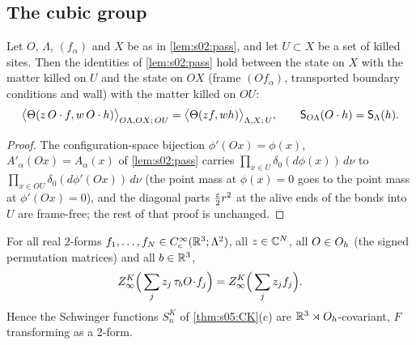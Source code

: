 \subsection{The cubic group}

\begin{lemma}\label{lem:s06:PK}
Let $O$, $\Lambda$, $(f_\alpha)$ and $X$ be as in \cref{lem:s02:pass}, and let $U\subset X$ be a set of killed sites. Then the identities of \cref{lem:s02:pass} hold between the state on $X$ with the matter killed on $U$ and the state on $OX$ (frame $(Of_\alpha)$, transported boundary conditions and wall) with the matter killed on $OU$:
\[
\big\langle\Theta(z\,O\cdot f,w\,O\cdot h)\big\rangle_{O\Lambda,OX;\,OU}=\big\langle\Theta(zf,wh)\big\rangle_{\Lambda,X;\,U},\qquad\mathsf S_{O\Lambda}(O\cdot h)=\mathsf S_\Lambda(h).
\]
\end{lemma}

\begin{proof}
The configuration-space bijection $\phi'(Ox)=\phi(x)$, $A'_\alpha(Ox)=A_\alpha(x)$ of \cref{lem:s02:pass} carries $\prod_{x\in U}\delta_0(d\phi(x))\,d\nu$ to $\prod_{x\in OU}\delta_0(d\phi'(Ox))\,d\nu$ (the point mass at $\phi(x)=0$ goes to the point mass at $\phi'(Ox)=0$), and the diagonal parts $\frac{\varepsilon}2r^2$ at the alive ends of the bonds into $U$ are frame-free; the rest of that proof is unchanged.
\end{proof}

\begin{theorem}\label{thm:s06:S1K}
For all real $2$-forms $f_1,\dots,f_N\in C^\infty_c(\mathbb R^3;\Lambda^2)$, all $z\in\mathbb C^N$, all $O\in O_h$ (the signed permutation matrices) and all $b\in\mathbb R^3$,
\[
Z^{K}_{\infty}\Big(\sum_jz_j\,\tau_bO\!\cdot\!f_j\Big)=Z^{K}_{\infty}\Big(\sum_jz_jf_j\Big).
\]
Hence the Schwinger functions $S^K_n$ of \cref{thm:s05:CK}(c) are $\mathbb R^3\rtimes O_h$-covariant, $F$ transforming as a $2$-form.
\end{theorem}

